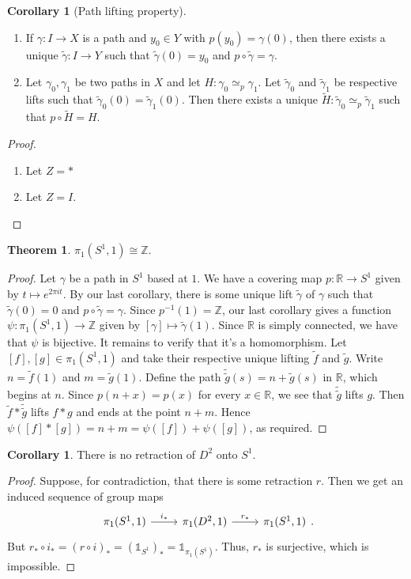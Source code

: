 \documentclass[10pt,letterpaper,cm]{nupset}
\theoremstyle{definition}
\theoremstyle{theorem}
\newtheorem{theorem}[definition]{Theorem}
\newtheorem{corollary}[definition]{Corollary}
\theoremstyle{remark}
\newcommand{\R}{\mathbb{R}}
\newcommand{\Z}{\mathbb Z}
\newcommand{\1}{\mathbb{1}}
\newcommand{\0}{\vec 0}
\begin{document}
\begin{corollary}[Path lifting property]
\begin{enumerate}
\item If $\gamma : I \to X$ is a path and $y_0 \in Y$ with $p(y_0) = \gamma(0)$, then there exists a unique $\tilde{\gamma} : I \to Y$ such that $\tilde{\gamma}(0) = y_0$ and $p \circ \tilde{\gamma} = \gamma$.
\item Let $\gamma_0, \gamma_1$ be two paths in $X$ and let $H : \gamma_0 \simeq_p \gamma_1$. Let $\tilde{\gamma}_0$ and $\tilde{\gamma}_1$ be respective lifts such that $\tilde{\gamma}_0 (0) = \tilde{\gamma}_1(0)$. Then there exists a unique $\widetilde{H} : \tilde{\gamma}_0 \simeq_p \tilde{\gamma}_1$ such that $p \circ \widetilde{H} = H$.
\end{enumerate}
\end{corollary}
\begin{proof} $ $
\begin{enumerate}
\item Let $Z = \ast$
\item Let $Z = I$.
\end{enumerate}
\end{proof}

\begin{theorem}
$\pi_1(S^1, 1) \cong \Z$.
\end{theorem}
\begin{proof}
Let $\gamma$ be a path in $S^1$ based at $1$. We have a covering map $p: \R \to S^1$ given by $t\mapsto e^{2\pi i t}$. By our last corollary, there is some unique lift $\tilde{\gamma}$ of $\gamma$ such that $\tilde{\gamma}(0) = 0$ and $p \circ \tilde{\gamma} = \gamma$. Since $p^{-1}(1) = \Z$, our last corollary gives a function $\psi: \pi_1(S^1, 1) \to \Z$ given by $[\gamma ] \mapsto \tilde{\gamma}(1)$. Since $\R$ is simply connected, we have that $\psi$ is bijective. It remains to verify that it's a homomorphism. Let $[f], [g] \in \pi_1(S^1, 1)$ and take their respective unique lifting $\tilde{f}$ and $\tilde{g}$. Write $n = \tilde{f}(1)$ and $m= \tilde{g}(1)$. Define the path $\tilde{\tilde{g}}(s) = n+ \tilde{g}(s)$ in $\R$, which begins at $n$. Since $p(n+x) = p(x)$ for every $x\in \R$, we see that $\tilde{\tilde{g}}$ lifts $g$. Then $\tilde{f} \ast \tilde{\tilde{g}}$ lifts $f \ast g$ and ends at the point $n+m$. Hence $\psi([f] \ast [g]) = n+m = \psi([f])  + \psi([g])$, as required. 
\end{proof}


\begin{corollary}
There is no retraction of $D^2$ onto $S^1$.
\end{corollary}
\begin{proof}
Suppose, for contradiction, that there is some retraction $r$. Then we get an induced sequence of group maps
\[
\begin{tikzcd}
{\pi_1(S^1, 1)} \arrow[r, "i_{\ast}"] & {\pi_1(D^2, 1)} \arrow[r, "r_{\ast}"] & {\pi_1(S^1, 1)}
\end{tikzcd}
.\] But $r_{\ast} \circ i_{\ast} = (r \circ i )_{\ast} = (\1_{S^1})_{\ast} = \1_{\pi_1(S^1)}$. Thus, $r_{\ast}$ is surjective, which is impossible. 
\end{proof}
\end{document}

